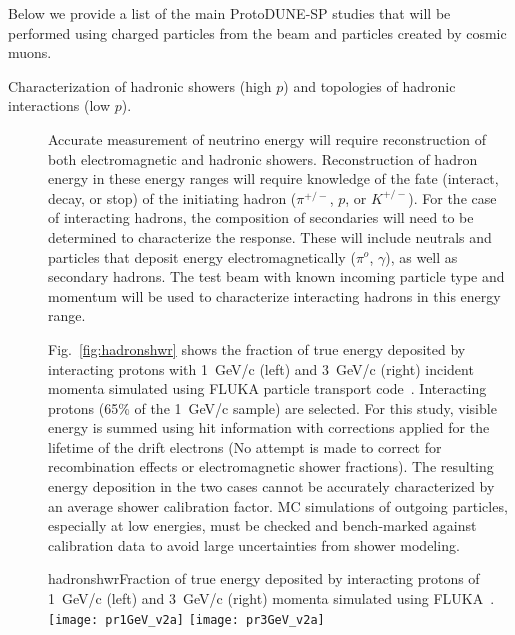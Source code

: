 Below  we provide a list of the main ProtoDUNE-SP studies that will be performed using charged particles from the beam and particles created by cosmic muons.
\begin{description}
\item [Characterization of hadronic showers (high $p$) and topologies of hadronic interactions (low $p$).]


Accurate measurement of neutrino energy will require reconstruction of both electromagnetic and hadronic showers. Reconstruction of hadron energy 
in these energy ranges will require knowledge of the fate (interact, decay, or stop) of the
initiating hadron ($\pi^{+/-}$, $p$, or $K^{+/-}$).
For the case of  interacting hadrons, the composition of secondaries
will need to be determined to characterize the response. 
These will include neutrals and particles that 
deposit energy electromagnetically ($\pi^o$, $\gamma$), as well as
secondary hadrons.
The test beam with known incoming particle type and momentum will be used
to characterize interacting hadrons in this energy range.


Fig.~\ref{fig:hadronshwr} shows the fraction of true energy deposited by interacting protons with 1~GeV/c (left) and
3~GeV/c (right) incident momenta simulated using FLUKA particle transport code~\cite{fluka05}. 
Interacting protons (65\% of the 1~GeV/c sample) are selected.
For this study, visible energy is summed using hit information with corrections applied for the lifetime of 
the drift electrons (No attempt is made to correct for recombination effects or electromagnetic shower fractions). 
The resulting energy deposition in the two cases cannot be 
accurately characterized by an average shower calibration factor. MC simulations of 
outgoing particles, especially at low energies, must be checked and bench-marked against calibration data to avoid
large uncertainties from shower modeling. 

\begin{cdrfigure}{hadronshwr}{Fraction of true energy deposited by interacting protons of 1~GeV/c (left) and
3~GeV/c (right) momenta simulated using FLUKA~\cite{fluka05}.}
\texttt{[image: pr1GeV\_v2a]}
\texttt{[image: pr3GeV\_v2a]}
\end{cdrfigure}



\end{description}
